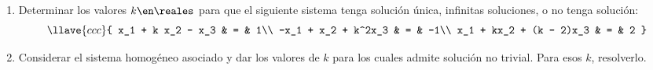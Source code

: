 \begin{enunciado}{\ejercicio}
  \begin{enumerate}[label=(\alph*)]
    \item Determinar los valores $k \en \reales$ para que el siguiente sistema tenga solución
          única, infinitas soluciones, o no tenga solución:
          $$
            \llave{ccc}{
              x_1 + k x_2 - x_3 & = & 1\\
              -x_1 + x_2 + k^2x_3 & = & -1\\
              x_1 + kx_2 + (k - 2)x_3 & = & 2
            }
          $$

    \item
          Considerar el sistema homogéneo asociado y dar los valores de $k$ para los cuales
          admite solución no trivial. Para esos $k$, resolverlo.
  \end{enumerate}
\end{enunciado}

